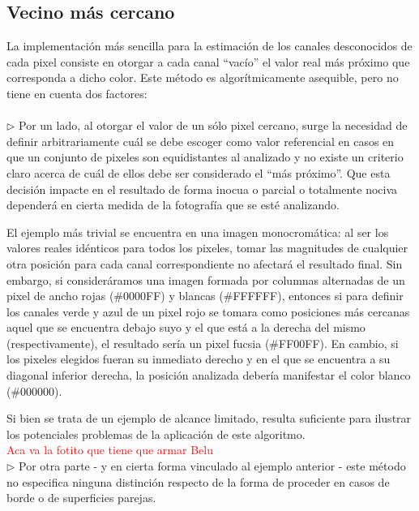 \documentclass[a4paper]{article}
\begin{document}
\subsection{Vecino m\'as cercano}
La implementación más sencilla para la estimación de los canales desconocidos de cada pixel consiste en otorgar a cada canal ``vacío'' el valor real m\'as pr\'oximo que corresponda a dicho color. Este m\'etodo es algor\'itmicamente asequible, pero no tiene en cuenta dos factores: \\
\\

$\triangleright$ Por un lado, al otorgar el valor de un sólo pixel cercano, surge la necesidad de definir arbitrariamente cuál se debe escoger como valor referencial en casos en que un conjunto de pixeles son equidistantes al analizado y no existe un criterio claro acerca de cuál de ellos debe ser considerado el ``más próximo''. Que esta decisión impacte en el resultado de forma inocua o parcial o totalmente nociva dependerá en cierta medida de la fotografía que se esté analizando.

El ejemplo más trivial se encuentra en una imagen monocromática: al ser los valores reales idénticos para todos los pixeles, tomar las magnitudes de cualquier otra posición para cada canal correspondiente no afectará el resultado final. Sin embargo, si consideráramos una imagen formada por columnas alternadas de un pixel de ancho rojas (\#0000FF) y blancas (\#FFFFFF), entonces si para definir los canales verde y azul de un pixel rojo se tomara como posiciones más cercanas aquel que se encuentra debajo suyo y el que está a la derecha del mismo (respectivamente), el resultado sería un pixel fucsia (\#FF00FF). En cambio, si los pixeles elegidos fueran su inmediato derecho y en el que se encuentra a su diagonal inferior derecha, la posición analizada debería manifestar el color blanco (\#000000).

Si bien se trata de un ejemplo de alcance limitado, resulta suficiente para ilustrar los potenciales problemas de la aplicación de este algoritmo.\\

\textcolor{red}{Aca va la fotito que tiene que armar Belu}\\

$\triangleright$ Por otra parte - y en cierta forma vinculado al ejemplo anterior - este método no especifica ninguna distinción respecto de la forma de proceder en casos de borde o de superficies parejas. \\
\end{document}
